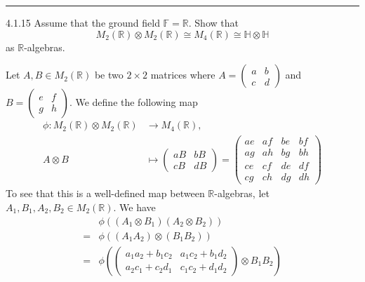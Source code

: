 \documentclass[a4paper, 12pt]{article}
\begin{document}
\noindent\rule{7in}{2.8pt}
\begin{problem}{4.1.15}
Assume that the ground field \(\mathbb{F}=\mathbb{R}\). Show that 
\[M_2(\mathbb{R})\otimes M_2(\mathbb{R})\cong M_4(\mathbb{R})\cong \mathbb{H}\otimes \mathbb{H}\]
as \(\mathbb{R}\)-algebras.
\end{problem}
\begin{solution}
Let \(A,B\in M_2(\mathbb{R})\) be two \(2\times 2\) matrices where \(A=\begin{pmatrix}
    a & b\\ 
    c&d
\end{pmatrix}\) and \(B=\begin{pmatrix}
    e&f\\ 
    g&h
\end{pmatrix}\). We define the following map 
\begin{align*}
    \phi:M_2(\mathbb{R})\otimes M_2(\mathbb{R})&\rightarrow M_4(\mathbb{R}),\\ 
             A\otimes B&\mapsto \begin{pmatrix}
                aB&bB\\ 
                cB&dB
             \end{pmatrix}=\begin{pmatrix}
                ae&af&be&bf\\ 
                ag&ah&bg&bh\\ 
                ce&cf&de&df\\ 
                cg&ch&dg&dh
             \end{pmatrix}
\end{align*}
To see that this is a well-defined map between \(\mathbb{R}\)-algebras, let \(A_1,B_1,A_2,B_2\in M_2(\mathbb{R})\). We have 
\begin{align*}
    &\phi((A_1\otimes B_1)(A_2\otimes B_2))\\[1em]
   =&\phi((A_1A_2)\otimes (B_1B_2))\\[1em]
   =&\phi(\begin{pmatrix}
    a_1a_2+b_1c_2&a_1c_2+b_1d_2\\
    a_2c_1+c_2d_1&c_1c_2+d_1d_2
   \end{pmatrix}\otimes B_1B_2 )\\[1em] 

\end{align*}
\end{solution}
\end{document}

